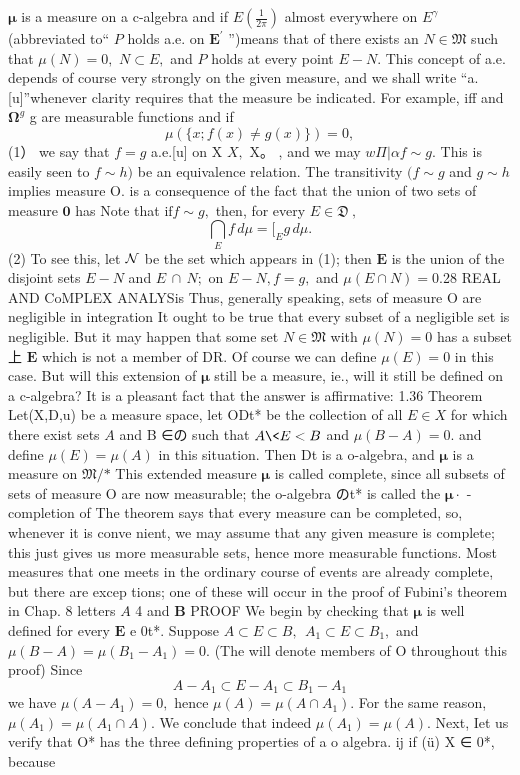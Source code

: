 $\boldsymbol{\mu}$ is a measure on a c-algebra and if $\scriptstyle{E\left(\scriptstyle{\frac{1}{2\pi}}\right)}$ almost everywhere on $E^{\gamma}$ (abbreviated to“ ${\mathbf{}}P$ holds a.e. on ${\boldsymbol{E}}^{\prime}$ ”)means that of there exists an $N\in{\mathfrak{M}}$ such that $\mu(N)=0,$ $N\subset E,$ and ${\mathbf{}}P$ holds at every point $E-N.$ This concept of a.e. depends of course very strongly on the given measure, and we shall write “a.[u]”whenever clarity requires that the measure be indicated. For example, iff and $\mathbf{\Omega}^{g}$ g are measurable functions and if $$ \mu(\{x;f(x)\neq g(x)\})=0, $$ (1） we say that $f=g$ a.e.[u] on X $X,$ X。 , and we may $w\Pi\vert\alpha f\sim g.$ This is easily seen to $f\sim h)$ be an equivalence relation. The transitivity $(f\sim g$ and $g\sim h$ implies measure O. is a consequence of the fact that the union of two sets of measure $\mathbf{0}$ has Note that ${\mathrm{if}}f\sim g,$ then, for every $E\in{\mathfrak{D}}\ ,$ $$ \bigcap_{E}f\,d\mu= [_{E}g\,d\mu. $$ (2) To see this, let ${\cal N}$ be the set which appears in (1); then $\boldsymbol{E}$ is the union of the disjoint sets $E-N$ and $E\,\cap\,N;$ on $E-N,f=g,$ and $\mu(E\cap N)=0.$28 REAL AND CoMPLEX ANALYSis Thus, generally speaking, sets of measure O are negligible in integration It ought to be true that every subset of a negligible set is negligible. But it may happen that some set $N\in{\mathfrak{M}}$ with $\mu(N)=0$ has a subset 上 $\boldsymbol{E}$ which is not a member of DR. Of course we can define $\mu(E)=0$ in this case. But will this extension of ${\boldsymbol{\mu}}$ still be a measure, ie., will it still be defined on a c-algebra? It is a pleasant fact that the answer is affirmative: 1.36 Theorem Let(X,D,u) be a measure space, let ODt* be the collection of all $\scriptstyle{E\in X}$ for which there exist sets $\scriptstyle A$ and B ∈の such that $A\<E<B$ and $\mu(B-A)=0.$ and define $\mu(E)=\mu(A)$ in this situation. Then Dt is a o-algebra, and ${\boldsymbol{\mu}}$ is a measure on ${\mathfrak{M}}/{\mathfrak{\ast}}$ This extended measure ${\boldsymbol{\mu}}$ is called complete, since all subsets of sets of measure O are now measurable; the o-algebra のt* is called the ${\boldsymbol{\mu}}\cdot$ -completion of The theorem says that every measure can be completed, so, whenever it is conve nient, we may assume that any given measure is complete; this just gives us more measurable sets, hence more measurable functions. Most measures that one meets in the ordinary course of events are already complete, but there are excep tions; one of these will occur in the proof of Fubini's theorem in Chap. 8 letters $\scriptstyle A$ 4 and $\boldsymbol{B}$ PROOF We begin by checking that $\boldsymbol{\mu}$ is well defined for every $\boldsymbol{E}$ e 0t*. Suppose $A\subset E\subset B,\ \ A_{1}\subset E\subset B_{1},$ and $\mu(B-A)=\mu(B_{1}-A_{1})=0.$ (The will denote members of O throughout this proof) Since $$ A-A_{1}\subset E-A_{1}\subset B_{1}-A_{1} $$ we have $\mu(A-A_{1})=0,$ hence $\mu(A)=\mu(A\cap A_{1}).$ For the same reason, $\mu(A_{1})=\mu(A_{1}\cap A).$ We conclude that indeed $\mu(A_{1})=\mu(A).$ Next, Iet us verify that O* has the three defining properties of a o algebra. ij if (ü) X ∈ 0*, because 